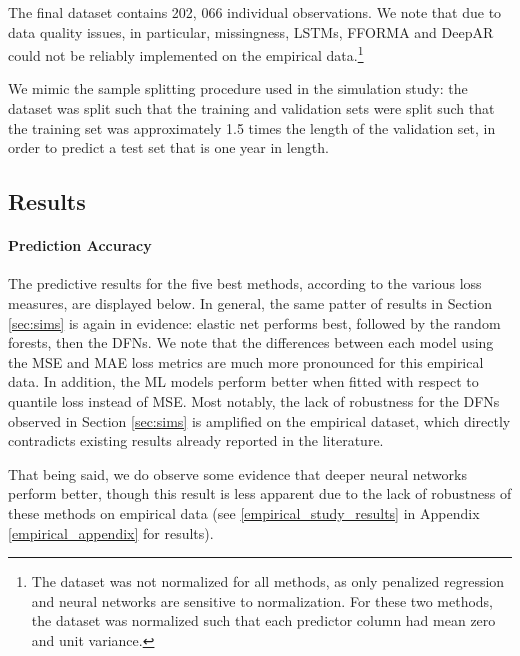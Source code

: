 \documentclass{article}
\begin{document}
The final dataset contains 202, 066 individual observations. We note that due to data quality issues, in particular, missingness, LSTMs, FFORMA and DeepAR could not be reliably implemented on the empirical data.\footnote{The dataset was not normalized for all methods, as only penalized regression and neural networks are sensitive to normalization. For these two methods, the dataset was normalized such that each predictor column had mean zero and unit variance.}

We mimic the sample splitting procedure used in the simulation study: the dataset was split such that the training and validation sets were split such that the training set was approximately 1.5 times the length of the validation set, in order to predict a test set that is one year in length.

\subsection{Results}



\paragraph{Prediction Accuracy}
The predictive results for the five best methods, according to the various loss measures, are displayed below. In general, the same patter of results in Section \ref{sec:sims} is again in evidence:  elastic net performs best, followed by the random forests, then the DFNs. We note that the differences between each model using the MSE and MAE loss metrics are much more pronounced for this empirical data. In addition, the ML models perform better when fitted with respect to quantile loss instead of MSE. Most notably, the lack of robustness for the DFNs observed in Section \ref{sec:sims} is amplified on the empirical dataset, which directly contradicts existing results already reported in the literature.



That being said, we do observe some evidence that deeper neural networks perform better, though this result is less apparent due to the lack of robustness of these methods on empirical data (see \ref{empirical_study_results} in Appendix \ref{empirical_appendix} for results).
\end{document}
